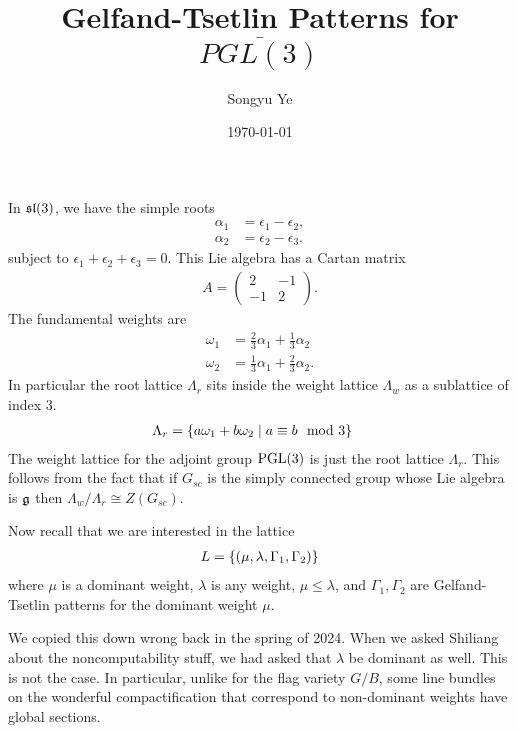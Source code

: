 \documentclass[12pt]{article}
\begin{document}
\rhead{\today}
\cfoot{\thepage}

\title{Gelfand-Tsetlin Patterns for $\overline{PGL(3)}$}

\author{Songyu Ye}
\date{\today}
\maketitle

In $\sl(3)$, we have the simple roots \begin{align*}
    \alpha_1 &= \epsilon_1 - \epsilon_2, \\
    \alpha_2 &= \epsilon_2 - \epsilon_3.
\end{align*} subject to $\epsilon_1 + \epsilon_2 + \epsilon_3 = 0$. This Lie algebra has a Cartan matrix \begin{align*}
    A = \begin{pmatrix}
        2 & -1 \\
        -1 & 2
    \end{pmatrix}.
\end{align*} The fundamental weights are \begin{align*}
    \omega_1 &= \frac{2}{3} \alpha_1 + \frac{1}{3} \alpha_2 \\
    \omega_2 &= \frac{1}{3} \alpha_1 + \frac{2}{3} \alpha_2.
\end{align*} In particular the root lattice $\Lambda_r$ sits inside the weight lattice $\Lambda_w$ as a sublattice of index 3. \begin{align*}
    \Lambda_r &= \set{a \omega_1 + b \omega_2 \mid a \equiv b \mod 3} 
\end{align*}
The weight lattice for the adjoint group $\PGL(3)$ is just the root lattice $\Lambda_r$. This follows from the fact that if $G_{sc}$ is the simply connected group whose Lie algebra is $\mf g$ then $\Lambda_w / \Lambda_r \cong Z(G_{sc})$.

Now recall that we are interested in the lattice \begin{align*}
    L = \set{(\mu,\lambda,\Gamma_1,\Gamma_2)}
\end{align*} where $\mu$ is a dominant weight, $\lambda$ is any weight, $\mu \leq \lambda$, and $\Gamma_1, \Gamma_2$ are Gelfand-Tsetlin patterns for the dominant weight $\mu$. 

\begin{remark}
    We copied this down wrong back in the spring of 2024. When we asked Shiliang about the noncomputability stuff, we had asked that $\lambda$ be dominant as well. This is not the case. In particular, unlike for the flag variety $G/B$, some line bundles on the wonderful compactification that correspond to non-dominant weights have global sections.
\end{remark}
\end{document}
